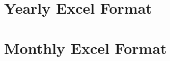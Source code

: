 \documentclass[letterpaper,10pt,english]{sphinxmanual}
\begin{document}
\section{Yearly Excel Format}
\label{\detokenize{manual:yearly-excel-format}}
\begin{figure}[H]
\centering

\end{figure}


\section{Monthly Excel Format}
\label{\detokenize{manual:monthly-excel-format}}
\begin{figure}[H]
\centering

\end{figure}



\renewcommand{\indexname}{Index}
\printindex
\end{document}
